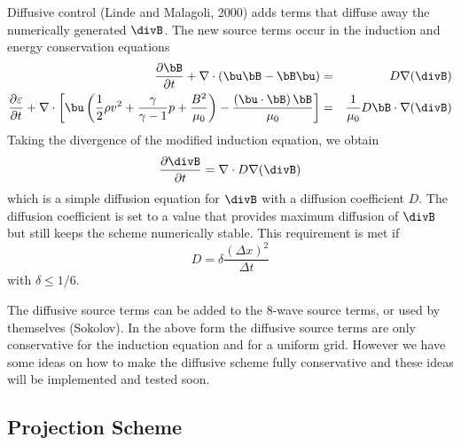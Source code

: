 Diffusive control (Linde and Malagoli, 2000) adds terms that diffuse
away the numerically generated $\divB$. The new source terms occur in 
the induction and energy conservation equations
\begin{eqnarray}
  \frac{\partial\bB}{\partial t} + \nabla \cdot(\bu\bB - \bB\bu)
      &=& D \nabla(\divB)                    \label{q-inductiondiff} \\
  \frac{\partial\varepsilon}{\partial t}+
      \nabla \cdot \left[ \bu \left( \frac12 \rho v^2 + 
      \frac{\gamma}{\gamma-1} p +
      \frac{B^2}{\mu_0} \right) - 
      \frac{\left(\bu\cdot\bB\right)\bB}{\mu_0}\right] 
      &=& \frac{1}{\mu_0} D \bB\cdot\nabla(\divB)             \label{q-energydiff}
\end{eqnarray}
Taking the divergence of the modified induction equation, we obtain
\begin{equation}
  \frac{\partial\divB}{\partial t}= \nabla\cdot D \nabla(\divB) 
\end{equation}
which is a simple diffusion equation for $\divB$ with a diffusion
coefficient $D$. The diffusion coefficient is set to a value that provides 
maximum diffusion of $\divB$ but still keeps the scheme numerically stable.
This requirement is met if
\begin{equation}
  D=\delta \frac{(\Delta x)^2}{\Delta t}
\end{equation}
with $\delta\le1/6$.

The diffusive source terms can be added to the 8-wave source terms, or used
by themselves (Sokolov). In the above form the diffusive source terms
are only conservative for the induction equation and for a uniform grid.
However we have some ideas on how to make the diffusive scheme fully 
conservative and these ideas will be implemented and tested soon.

\subsection{Projection Scheme \label{section:projection}}

